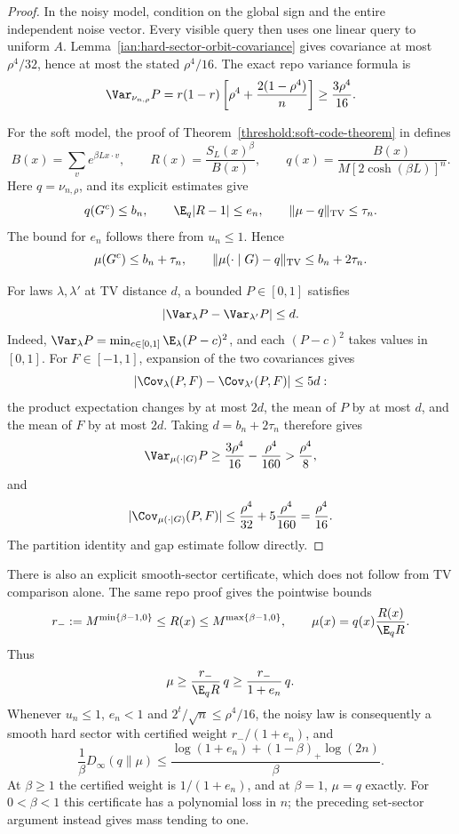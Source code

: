 \begin{proof}
In the noisy model, condition on the global sign and the entire
independent noise vector. Every visible query then uses one linear
query to uniform \(A\). Lemma~\ref{ian:hard-sector-orbit-covariance}
gives covariance at most \(\rho^4/32\), hence at most the stated
\(\rho^4/16\). The exact repo variance formula is
\[
 \Var_{\nu_{n,\rho}}P
 =r(1-r)\left[\rho^4+\frac{2(1-\rho^4)}n\right]
 \ge\frac{3\rho^4}{16}.
\]

For the soft model, the proof of
Theorem~\ref{threshold:soft-code-theorem} in
defines
\[
 B(x)=\sum_ve^{\beta Lx\cdot v},\qquad
 R(x)=\frac{S_L(x)^\beta}{B(x)},\qquad
 q(x)=\frac{B(x)}{M[2\cosh(\beta L)]^n}.
\]
Here \(q=\nu_{n,\rho}\), and its explicit estimates give
\[
 q(G^c)\le b_n,\qquad
 \E_q|R-1|\le e_n,\qquad
 \|\mu-q\|_{\rm TV}\le\tau_n.
\]
The bound for \(e_n\) follows there from \(u_n\le1\). Hence
\[
 \mu(G^c)\le b_n+\tau_n,\qquad
 \|\mu(\cdot\mid G)-q\|_{\rm TV}\le b_n+2\tau_n.
\]

For laws \(\lambda,\lambda'\) at TV distance \(d\), a bounded
\(P\in[0,1]\) satisfies
\[
 |\Var_\lambda P-\Var_{\lambda'}P|\le d.
\]
Indeed, \(\Var_\lambda P=\min_{c\in[0,1]}\E_\lambda(P-c)^2\), and each
\((P-c)^2\) takes values in \([0,1]\).
For \(F\in[-1,1]\), expansion of the two covariances gives
\[
 |\Cov_\lambda(P,F)-\Cov_{\lambda'}(P,F)|\le5d:
\]
the product expectation changes by at most \(2d\), the mean of \(P\)
by at most \(d\), and the mean of \(F\) by at most \(2d\).
Taking \(d=b_n+2\tau_n\) therefore gives
\[
 \Var_{\mu(\cdot\mid G)}P
 \ge\frac{3\rho^4}{16}-\frac{\rho^4}{160}
 >\frac{\rho^4}{8},
\]
and
\[
 |\Cov_{\mu(\cdot\mid G)}(P,F)|
 \le\frac{\rho^4}{32}+5\frac{\rho^4}{160}
 =\frac{\rho^4}{16}.
\]
The partition identity and gap estimate follow directly.
\end{proof}

There is also an explicit smooth-sector certificate, which does not
follow from TV comparison alone. The same repo proof gives the
pointwise bounds
\[
 r_-:=M^{\min\{\beta-1,0\}}\le R(x)
 \le M^{\max\{\beta-1,0\}},
 \qquad
 \mu(x)=q(x)\frac{R(x)}{\E_qR}.
\]
Thus
\[
 \mu\ge\frac{r_-}{\E_qR}\,q
 \ge\frac{r_-}{1+e_n}\,q.
\]
Whenever \(u_n\le1\), \(e_n<1\) and \(2^t/\sqrt n\le\rho^4/16\), the noisy law is consequently a smooth hard sector with certified
weight \(r_-/(1+e_n)\), and
\[
 \frac1\beta D_\infty(q\|\mu)
 \le\frac{\log(1+e_n)+(1-\beta)_+\log(2n)}{\beta}.
\]
At \(\beta\ge1\) the certified weight is \(1/(1+e_n)\), and at
\(\beta=1\), \(\mu=q\) exactly. For \(0<\beta<1\) this certificate
has a polynomial loss in \(n\); the preceding set-sector argument
instead gives mass tending to one.

